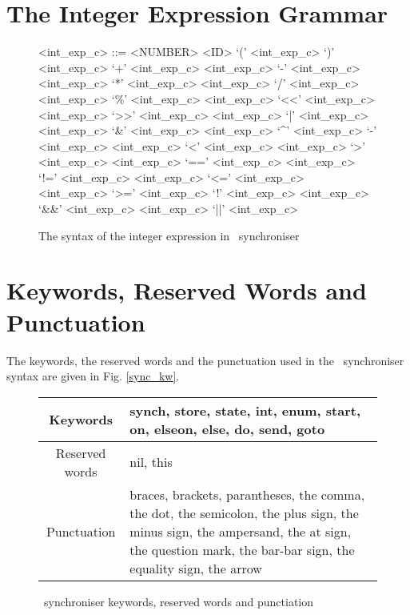     \section{The Integer Expression Grammar\label{int_exp_gr}}
\setlength{\grammarindent}{8em} %
\begin{figure}%
\scriptsize
\begin{grammar}
<int\_exp\_c> ::= <NUMBER>
                \alt <ID>
                \alt `(' <int\_exp\_c> `)'
                \alt <int\_exp\_c> `+' <int\_exp\_c>
                \alt <int\_exp\_c> `-' <int\_exp\_c>
                \alt <int\_exp\_c> `*' <int\_exp\_c>
                \alt <int\_exp\_c> `/' <int\_exp\_c>
                \alt <int\_exp\_c> `\%' <int\_exp\_c>
                \alt <int\_exp\_c> `<<' <int\_exp\_c>
                \alt <int\_exp\_c> `>>' <int\_exp\_c>
                \alt <int\_exp\_c> `|' <int\_exp\_c>
                \alt <int\_exp\_c> `&' <int\_exp\_c>
                \alt <int\_exp\_c> `^' <int\_exp\_c>
                \alt `-' <int\_exp\_c> %
                \alt <int\_exp\_c> `<' <int\_exp\_c>
                \alt <int\_exp\_c> `>' <int\_exp\_c>
                \alt <int\_exp\_c> `==' <int\_exp\_c>
                \alt <int\_exp\_c> `!=' <int\_exp\_c>
                \alt <int\_exp\_c> `<=' <int\_exp\_c>
                \alt <int\_exp\_c> `>=' <int\_exp\_c>
                \alt `!' <int\_exp\_c>
                \alt <int\_exp\_c> `&&' <int\_exp\_c>
                \alt <int\_exp\_c> `||' <int\_exp\_c>
\end{grammar}
\caption{The syntax of the integer expression in \ak\ synchroniser}
\end{figure}


    \section{Keywords, Reserved Words and Punctuation\label{sync_kw}}
The keywords, the reserved words and the punctuation used in the \ak\ synchroniser syntax are given in Fig. \ref{sync_kw}.
\begin{figure}%
\centering
\begin{tabular}{|c|p{}|}
\hline
Keywords & synch, store, state, int, enum, start, on, elseon, else, do, send, goto\\
\hline
Reserved words & nil, this\\
\hline
Punctuation & braces, brackets, parantheses, the comma, the dot, the semicolon, the plus sign, the minus sign, the ampersand, the at sign, the question mark, the bar-bar sign, the equality sign, the arrow\\
\hline
\end{tabular}
\caption{\ak\ synchroniser keywords, reserved words and punctiation}
\end{figure}


